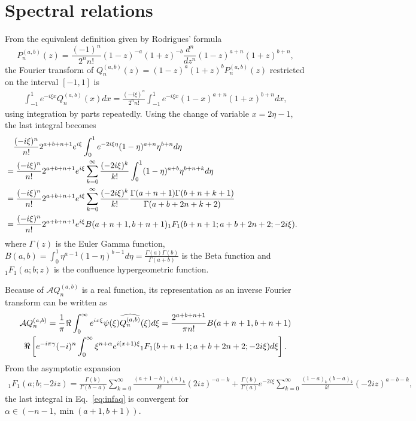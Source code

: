 \section{Spectral relations}

From the equivalent definition given by Rodrigues' formula
\[
  P_{n}^{(a,b)}(z) = \frac{(-1)^n}{2^nn!} (1-z)^{-a}(1+z)^{-b}
  \frac{d^n}{dz^n} (1-z)^{a+n}(1+z)^{b+n},
\]
the Fourier transform of $Q_n^{(a,b)}(z) = (1-z)^a(1+z)^bP_n^{(a,b)}(z)$
restricted on the interval $[-1,1]$ is 
\begin{align*}
  \int_{-1}^1 e^{-i\xi x} Q_n^{(a,b)}(x)dx
  = \frac{(-i\xi)^n}{2^nn!}\int_{-1}^1 e^{-i\xi x} (1-x)^{a+n}(1+x)^{b+n}dx,
\end{align*}
using integration by parts repeatedly. Using the change of variable $x = 2\eta-1$, the last 
integral becomes 
\begin{align*}
  &\quad \frac{(-i\xi)^n}{n!} 2^{a+b+n+1}e^{i\xi}
  \int_0^1 e^{-2i\xi\eta}(1-\eta)^{a+n}\eta^{b+n} d\eta\cr
  &= \frac{(-i\xi)^n}{n!} 2^{a+b+n+1}e^{i\xi}\sum_{k=0}^\infty \frac{(-2i\xi)^k}{k!}
  \int_0^1 (1-\eta)^{a+b}\eta^{b+n+k}d\eta\cr
  &= 
  \frac{(-i\xi)^n}{n!} 2^{a+b+n+1}e^{i\xi}\sum_{k=0}^\infty \frac{(-2i\xi)^k}{k!}
  \frac{\Gamma(a+n+1)\Gamma(b+n+k+1)}{\Gamma(a+b+2n+k+2)} \cr
  &= \frac{(-i\xi)^n}{n!} 2^{a+b+n+1}e^{i\xi}B(a+n+1,b+n+1)
  { }_1F_1(b+n+1;a+b+2n+2;-2i\xi).
\end{align*}
where $\Gamma(z)$ is the Euler Gamma function, $B(a,b)=\int_0^1 \eta^{a-1}(1-\eta)^{b-1}d\eta
=\frac{\Gamma(a)\Gamma(b)}{\Gamma(a+b)}$ is the Beta function
and ${ }_1F_1(a;b;z)$ is the confluence hypergeometric function.

Because of $\mathcal{A}Q_n^{(a,b)}$ is a real function, its representation as 
an inverse Fourier transform can be  written as 
\begin{multline}
  \mathcal{A}Q_n^{(a,b)} = \frac{1}{\pi} \Re \int_0^\infty 
  e^{ix\xi} \psi(\xi) \widehat{Q_n^{(a,b)}}(\xi)d\xi 
  = \frac{2^{a+b+n+1}}{\pi n!}B(a+n+1,b+n+1)\cr
  \Re\left[ e^{-i\pi\gamma} (-i)^n
  \int_0^\infty \xi^{n+\alpha} e^{i(x+1)\xi}
{ }_1F_1(b+n+1;a+b+2n+2;-2i\xi)d\xi\right].
\label{eq:infaq}
\end{multline}
From the asymptotic expansion 
\begin{align*}
    { }_1F_1(a;b;-2iz) 
    =\frac{\Gamma(b)}{\Gamma(b-a)}
    \sum_{k=0}^\infty \frac{(a+1-b)_k(a)_k}{k!}(2iz)^{-a-k}
    +\frac{\Gamma(b)}{\Gamma(a)}
    e^{-2i\xi} \sum_{k=0}^\infty \frac{(1-a)_k(b-a)_k}{k!}(-2iz)^{a-b-k},
  \end{align*}
  the last integral in Eq.~\eqref{eq:infaq} is convergent for 
  $\alpha \in (-n-1, \min(a+1,b+1))$.
\begin{lem}
\end{lem}

